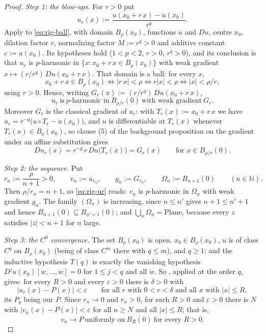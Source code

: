 \begin{proof}
\emph{Step 1: the blow-ups.}  For $r>0$ put
\[
  u_r(x):=\frac{u(x_0+r\,x)-u(x_0)}{r^{q}} .
\]
Apply  to \eqref{eq:rig-ball}, with domain $B_\rho(x_0)$, functions $u$
and $Du$, centre $x_0$, dilation factor $r$, normalizing factor $M:=r^{q}>0$ and additive
constant $c:=u(x_0)$.  Its hypotheses hold ($1<p<2$, $r>0$, $r^{q}>0$), and its conclusion is
that $u_r$ is $p$-harmonic in $\{x:x_0+r\,x\in B_\rho(x_0)\}$ with weak gradient
$x\mapsto(r/r^{q})\,Du(x_0+r\,x)$.  That domain is a ball: for every $x$,
\[
  x_0+r\,x\in B_\rho(x_0)\iff\lvert r\,x\rvert<\rho\iff r\lvert x\rvert<\rho
  \iff\lvert x\rvert<\rho/r,
\]
using $r>0$.  Hence, writing $G_r(x):=(r/r^{q})\,Du(x_0+r\,x)$,
\begin{equation}\label{eq:rig-ur}
  u_r\ \text{is}\ p\text{-harmonic in}\ B_{\rho/r}(0)\ \text{with weak gradient}\ G_r .
\end{equation}
Moreover $G_r$ is the classical gradient of $u_r$: with $T_r(x):=x_0+r\,x$ we have
$u_r=r^{-q}\bigl(u\circ T_r-u(x_0)\bigr)$, and $u$ is differentiable at $T_r(x)$ whenever
$T_r(x)\in B_\rho(x_0)$, so clause (5) of the background proposition on the gradient under an
affine substitution gives
\begin{equation}\label{eq:rig-grad}
  Du_r(x)=r^{-q}\,r\,Du\bigl(T_r(x)\bigr)=G_r(x)\qquad\text{for }x\in B_{\rho/r}(0).
\end{equation}

\emph{Step 2: the sequence.}  Put
\[
  r_n:=\frac{\rho}{n+1}>0,\qquad v_n:=u_{r_n},\qquad g_n:=G_{r_n},\qquad
  \Omega_n:=B_{n+1}(0)\qquad(n\in\mathbb{N}).
\]
Then $\rho/r_n=n+1$, so \eqref{eq:rig-ur} reads: $v_n$ is $p$-harmonic in $\Omega_n$ with weak
gradient $g_n$.  The family $(\Omega_n)$ is increasing, since $n\le n'$ gives $n+1\le n'+1$ and
hence $B_{n+1}(0)\subseteq B_{n'+1}(0)$; and $\bigcup_n\Omega_n=\mathrm{Plane}$, because every
$z$ satisfies $\lvert z\rvert<n+1$ for $n$ large.

\emph{Step 3: the $C^0$ convergence.}  The set $B_\rho(x_0)$ is open, $x_0\in B_\rho(x_0)$, $u$
is of class $C^{q}$ on $B_\rho(x_0)$ (being of class $C^{m}$ there with $q\le m$), and $q\ge1$;
and the inductive hypothesis $T(q)$ is exactly the vanishing hypothesis
$D^{j}u(x_0)[w,\ldots,w]=0$ for $1\le j<q$ and all $w$.  So
, applied at the order $q$, gives: for every $R>0$ and every
$\varepsilon>0$ there is $\delta>0$ with
\begin{equation}\label{eq:rig-c0}
  \lvert u_r(x)-P(x)\rvert<\varepsilon\qquad
  \text{for all }r\text{ with }0<r<\delta\text{ and all }x\text{ with }\lvert x\rvert\le R,
\end{equation}
its $P_q$ being our $P$.  Since $r_n\to0$ and $r_n>0$, for each $R>0$ and $\varepsilon>0$ there
is $N$ with $\lvert v_n(x)-P(x)\rvert<\varepsilon$ for all $n\ge N$ and all
$\lvert x\rvert\le R$; that is,
\begin{equation}\label{eq:rig-c0seq}
  v_n\to P\ \text{uniformly on}\ \overline{B_R(0)}\ \text{for every }R>0 .
\end{equation}


\end{proof}
